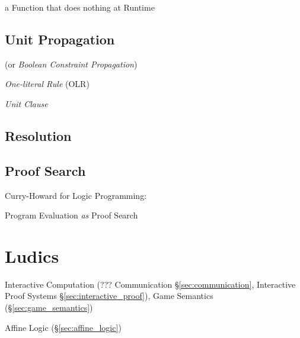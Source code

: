 
a Function that does nothing at Runtime



\subsection{Unit Propagation}\label{sec:unit_propagation}

(or \emph{Boolean Constraint Propagation})

\emph{One-literal Rule} (OLR)

\emph{Unit Clause}



\subsection{Resolution}\label{sec:resolution}

\subsection{Proof Search}\label{sec:proof_search}

Curry-Howard for Logic Programming: \cite{wadler12}

Program Evaluation \emph{as} Proof Search



\section{Ludics} \label{sec:ludics}

\cite{girard01}

Interactive Computation (??? Communication \S\ref{sec:communication},
Interactive Proof Systems \S\ref{sec:interactive_proof}),
Game Semantics (\S\ref{sec:game_semantics})

Affine Logic (\S\ref{sec:affine_logic})

